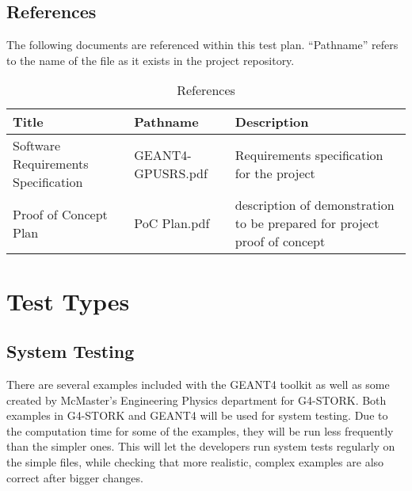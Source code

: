\documentclass[12pt]{article}
\begin{document}
\subsection{References}
The following documents are referenced within this test plan. ``Pathname'' refers to the name of the file as it exists in the project repository.
\begin{table}[h]
\centering
\caption{References}\label{Table_References}
\begin{tabular}{>{\raggedright\arraybackslash}p{}>{\raggedright\arraybackslash}p{}>{\raggedright\arraybackslash}p{}}
\toprule
\bf Title & \bf Pathname & \bf Description\\\midrule
Software Requirements Specification & GEANT4-GPUSRS.pdf & Requirements specification for the project\\
Proof of Concept Plan & PoC Plan.pdf & description of demonstration to be prepared for project proof of concept\\
\bottomrule
\end{tabular}
\end{table}

\section{Test Types}

\subsection{System Testing} %
There are several examples included with the GEANT4 toolkit as well as some created by McMaster's Engineering Physics department for G4-STORK. Both examples in G4-STORK and GEANT4 will be used for system testing. Due to the computation time for some of the examples, they will be run less frequently than the simpler ones. This will let the developers run system tests regularly on the simple files, while checking that more realistic, complex examples are also correct after bigger changes.
\newpage
\end{document}
